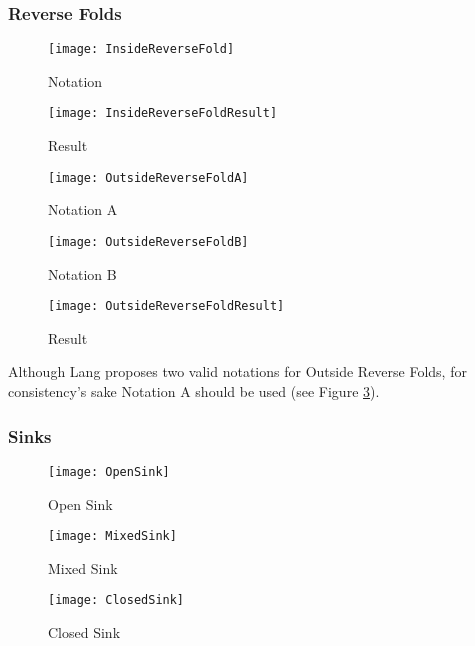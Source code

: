 \newpage

\subsubsection*{Reverse Folds}
\begin{figure*}[htbp]
	\centering
	\begin{subfigure}{0.4\textwidth}
		\texttt{[image: InsideReverseFold]}
		\caption{Notation}
		\label{fig:insideReverseFoldA}
	\end{subfigure}
	\begin{subfigure}{0.4\textwidth}
		\texttt{[image: InsideReverseFoldResult]}
		\caption{Result}
		\label{fig:insideReverseFoldResult}
	\end{subfigure}
	\caption{Inside Reverse Fold}
	\label{fig:insideReverseFold}
\end{figure*}
\begin{figure*}[htbp]
	\begin{subfigure}{0.3\textwidth}
		\texttt{[image: OutsideReverseFoldA]}
		\caption{Notation A}
		\label{fig:outsideReverseFoldA}
	\end{subfigure}
	\begin{subfigure}{0.3\textwidth}
		\texttt{[image: OutsideReverseFoldB]}
		\caption{Notation B}
		\label{fig:outsideReverseFoldB}
	\end{subfigure}
	\begin{subfigure}{0.3\textwidth}
		\texttt{[image: OutsideReverseFoldResult]}
		\caption{Result}
		\label{fig:outsideReverseFoldResult}
	\end{subfigure}
	\caption{Outside Reverse Fold}
	\label{fig:outsideReverseFold}
\end{figure*}
\noindent Although Lang proposes two valid notations for Outside Reverse Folds, for consistency's sake Notation A should be used (see Figure \ref{fig:outsideReverseFoldA}).

\newpage
\subsubsection*{Sinks}
\begin{figure*}[htbp]
	\centering
	\begin{subfigure}{0.7\textwidth}
		\texttt{[image: OpenSink]}
		\caption{Open Sink}
		\label{fig:openSink}
	\end{subfigure}
	\begin{subfigure}{0.7\textwidth}
		\texttt{[image: MixedSink]}
		\caption{Mixed Sink}
		\label{fig:mixedSink}
	\end{subfigure}
	\begin{subfigure}{0.7\textwidth}
		\texttt{[image: ClosedSink]}
		\caption{Closed Sink}
		\label{fig:closedSink}
	\end{subfigure}
\end{figure*}